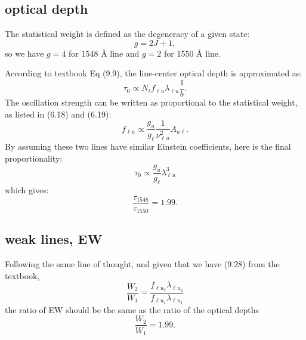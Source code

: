 \documentclass[12pt,letterpaper]{article}
\begin{document}
\subsection{optical depth}
The statistical weight is defined as the degeneracy of a given state:
\begin{equation*}
    g = 2 J + 1,
\end{equation*}
so we have $g = 4$ for 1548 {\AA} line and $g = 2$ for 1550 {\AA} line.

According to textbook Eq (9.9), the line-center optical depth is approximated as:
\begin{equation*}
    \tau_0 \propto N_\ell f_{\ell u} \lambda_{\ell u} \frac{1}{b}.
\end{equation*}
The oscillation strength can be written as proportional to the statistical weight, as listed in (6.18) and (6.19):
\begin{equation*}
    f_{\ell u} \propto \frac{g_u}{g_\ell} \frac{1}{\nu_{\ell u}^2} A_{u \ell}.
\end{equation*}
By assuming these two lines have similar Einstein coefficients, here is the final proportionality:
\begin{equation*}
    \tau_0 \propto \frac{g_u}{g_\ell} \lambda_{\ell u}^3
\end{equation*}
which gives:
\begin{equation*}
    \frac{\tau_{1548}}{\tau_{1550}} = 1.99.
\end{equation*}

\subsection{weak lines, EW}
Following the same line of thought, and given that we have (9.28) from the textbook, 
\begin{equation*}
    \frac{W_2}{W_1} =
     \frac{f_{\ell u_2} \lambda_{\ell u_2}}{f_{\ell u_1} \lambda_{\ell u_1}}
\end{equation*}
the ratio of EW should be the same as the ratio of the optical depths
\begin{equation*}
    \frac{W_2}{W_1} = 1.99.
\end{equation*}
\end{document}
